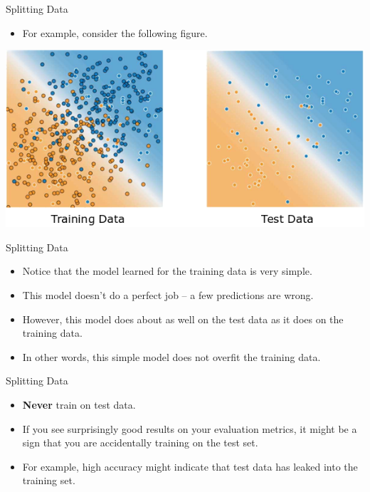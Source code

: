 \documentclass{beamer}
\begin{document}

\begin{frame}{Splitting Data}
\begin{itemize}
    \item For example, consider the following figure. 
\end{itemize}
\medskip
\includegraphics[width=1.0\textwidth]{images/TrainingDataVsTestData.png}
\end{frame}


\begin{frame}{Splitting Data}
\begin{itemize}
\item Notice that the model learned for the training data is very simple. 

\medskip
\item This model doesn't do a perfect job -- a few predictions are wrong. 

\medskip
\item However, this model does about as well on the test data as it does on the training data. 
    
\medskip
\item In other words, this simple model does not overfit the training data.
\end{itemize}
\end{frame}


\begin{frame}{Splitting Data}
\begin{itemize}
\item {\bf Never} train on test data. 
    
\medskip
\item If you see surprisingly good results on your evaluation metrics, it might be a sign that you are accidentally training on the test set. 

\medskip
\item For example, high accuracy might indicate that test data has leaked into the training set.
\end{itemize}
\end{frame}
\end{document}
